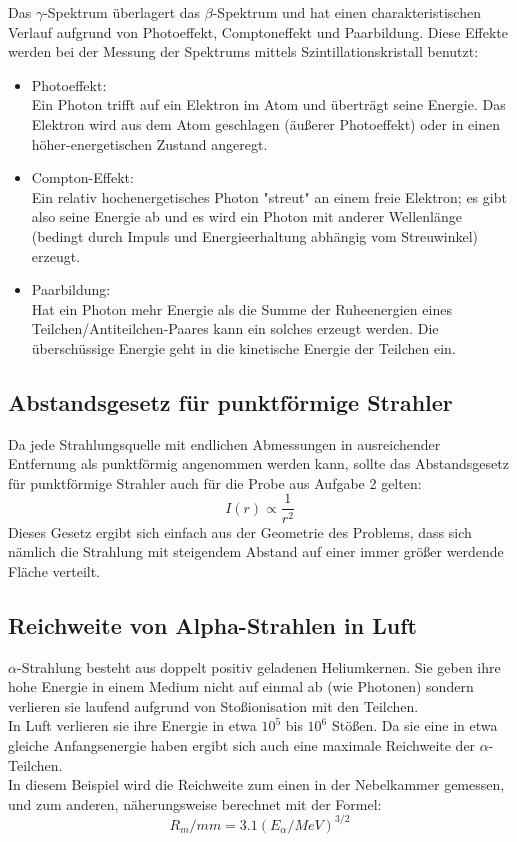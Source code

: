 \documentclass[12pt,a4paper]{article}
\begin{document}
\begin{multicols}{2}
\noindent Das $\gamma$-Spektrum überlagert das $\beta$-Spektrum und hat einen charakteristischen Verlauf aufgrund von Photoeffekt, Comptoneffekt und Paarbildung. Diese Effekte werden bei der Messung der Spektrums mittels Szintillationskristall benutzt:\\
\begin{itemize}
	\item Photoeffekt:\\
	Ein Photon trifft auf ein Elektron im Atom und überträgt seine Energie. Das Elektron wird aus dem Atom geschlagen (äußerer Photoeffekt) oder in einen höher-energetischen Zustand angeregt.
	\item Compton-Effekt:\\
	Ein relativ hochenergetisches Photon "streut" an einem freie Elektron; es gibt also seine Energie ab und es wird ein Photon mit anderer Wellenlänge (bedingt durch Impuls und Energieerhaltung abhängig vom Streuwinkel) erzeugt.
	\item Paarbildung:\\
	Hat ein Photon mehr Energie als die Summe der Ruheenergien eines Teilchen/Antiteilchen-Paares kann ein solches erzeugt werden. Die überschüssige Energie geht in die kinetische Energie der Teilchen ein.

\end{itemize}

\subsection{Abstandsgesetz für punktförmige Strahler}
Da jede Strahlungsquelle mit endlichen Abmessungen in ausreichender Entfernung als punktförmig angenommen werden kann, sollte das Abstandsgesetz für punktförmige Strahler auch für die Probe aus Aufgabe 2 gelten:
$$I(r) \propto \frac{1}{r^2}$$
Dieses Gesetz ergibt sich einfach aus der Geometrie des Problems, dass sich nämlich die Strahlung mit steigendem Abstand auf einer immer größer werdende Fläche verteilt.

\subsection{Reichweite von Alpha-Strahlen in Luft}

$\alpha$-Strahlung besteht aus doppelt positiv geladenen Heliumkernen. Sie geben ihre hohe Energie in einem Medium nicht auf einmal ab (wie Photonen) sondern verlieren sie laufend aufgrund von Stoßionisation mit den Teilchen.\\
In Luft verlieren sie ihre Energie in etwa $10^5$ bis $10^6$ Stößen. Da sie eine in etwa gleiche Anfangsenergie haben ergibt sich auch eine maximale Reichweite der $\alpha$-Teilchen.\\
In diesem Beispiel wird die Reichweite zum einen in der Nebelkammer gemessen, und zum anderen, näherungsweise berechnet mit der Formel:
$$R_m / mm = 3.1(E_{\alpha} / MeV)^{3/2}$$



\end{multicols}
\end{document}
